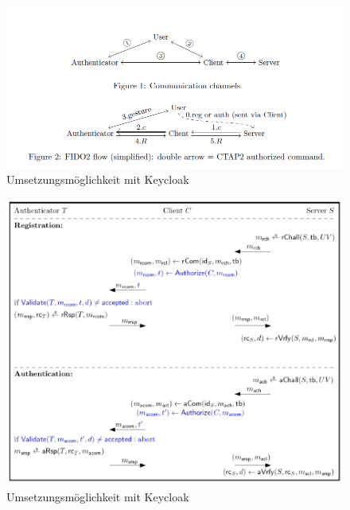 \begin{figure}[h]
	\centering 
	\includegraphics[width=1\textwidth]{img/abbildungen/fido2-simple.png}
	\captionsetup{format=hang}
	\caption{Umsetzungsmöglichkeit mit Keycloak}
\end{figure}

\begin{figure}[h]
	\centering 
	\includegraphics[width=1\textwidth]{img/abbildungen/Fido2.png}
	\captionsetup{format=hang}
	\caption{Umsetzungsmöglichkeit mit Keycloak}
\end{figure}

